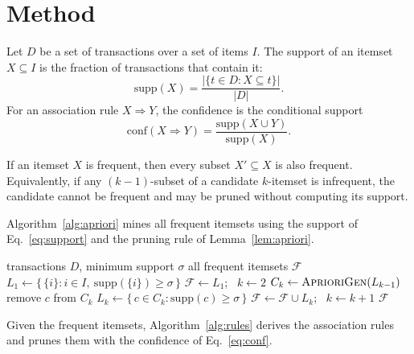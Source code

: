 \section{Method}
\label{sec:method}
Let $D$ be a set of transactions over a set of items $I$. The support of an
itemset $X \subseteq I$ is the fraction of transactions that contain it:
\begin{equation}
\label{eq:support}
\mathrm{supp}(X) = \frac{|\{t \in D : X \subseteq t\}|}{|D|}.
\end{equation}
For an association rule $X \Rightarrow Y$, the confidence is the conditional
support
\begin{equation}
\label{eq:conf}
\mathrm{conf}(X \Rightarrow Y) = \frac{\mathrm{supp}(X \cup Y)}{\mathrm{supp}(X)}.
\end{equation}

\begin{lemma}
\label{lem:apriori}
If an itemset $X$ is frequent, then every subset $X' \subseteq X$ is also frequent.
Equivalently, if any $(k-1)$-subset of a candidate $k$-itemset is infrequent, the
candidate cannot be frequent and may be pruned without computing its support.
\end{lemma}

Algorithm~\ref{alg:apriori} mines all frequent itemsets using the support of
Eq.~\eqref{eq:support} and the pruning rule of Lemma~\ref{lem:apriori}.

\begin{algorithm}
\caption{Apriori frequent-itemset mining}
\label{alg:apriori}
\begin{algorithmic}[1]
\Require transactions $D$, minimum support $\sigma$
\Ensure all frequent itemsets $\mathcal{F}$
\State $L_1 \gets \{\,\{i\} : i \in I,\ \mathrm{supp}(\{i\}) \ge \sigma\,\}$
\State $\mathcal{F} \gets L_1$; \ $k \gets 2$
    \State $C_k \gets \Call{AprioriGen}{L_{k-1}}$ 
            \State remove $c$ from $C_k$ 
        \EndIf
    \EndFor
    \State $L_k \gets \{\, c \in C_k : \mathrm{supp}(c) \ge \sigma \,\}$
    \State $\mathcal{F} \gets \mathcal{F} \cup L_k$; \ $k \gets k + 1$
\EndWhile
\State \Return $\mathcal{F}$
\end{algorithmic}
\end{algorithm}

Given the frequent itemsets, Algorithm~\ref{alg:rules} derives the association
rules and prunes them with the confidence of Eq.~\eqref{eq:conf}.

